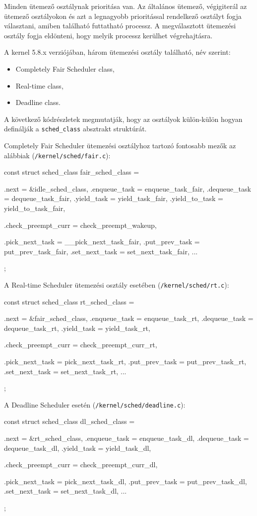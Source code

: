Minden ütemező osztálynak prioritása van. 
Az általános ütemező, végigiterál az ütemező osztályokon és azt a legnagyobb prioritással rendelkező osztályt fogja választani, amiben található futtatható processz. A megválasztott ütemezési osztály fogja eldönteni, hogy melyik processz kerülhet végrehajtásra.

A kernel 5.8.x verziójában, három ütemezési osztály található, név szerint: 
\begin{itemize}
	 \item Completely Fair Scheduler class,
	 \item Real-time class,
	 \item Deadline class.
\end{itemize}
A következő kódrészletek megmutatják, hogy az osztályok külön-külön hogyan definálják a \texttt{sched\_class} absztrakt struktúrát.

Completely Fair Scheduler ütemezési osztályhoz tartozó fontosabb mezők az alábbiak (\texttt{/kernel/sched/fair.c}):
\begin{cpp}
const struct sched_class fair_sched_class = {
	.next			= &idle_sched_class,
	.enqueue_task		= enqueue_task_fair,
	.dequeue_task		= dequeue_task_fair,
	.yield_task		= yield_task_fair,
	.yield_to_task		= yield_to_task_fair,

	.check_preempt_curr	= check_preempt_wakeup,

	.pick_next_task		= __pick_next_task_fair,
	.put_prev_task		= put_prev_task_fair,
	.set_next_task          = set_next_task_fair,
...
};
\end{cpp}

A Real-time Scheduler ütemezési osztály esetében (\texttt{/kernel/sched/rt.c}):
\begin{cpp}
const struct sched_class rt_sched_class = {
	.next			= &fair_sched_class,
	.enqueue_task		= enqueue_task_rt,
	.dequeue_task		= dequeue_task_rt,
	.yield_task		= yield_task_rt,

	.check_preempt_curr	= check_preempt_curr_rt,

	.pick_next_task		= pick_next_task_rt,
	.put_prev_task		= put_prev_task_rt,
	.set_next_task          = set_next_task_rt,
...
};
\end{cpp}

A Deadline Scheduler esetén (\texttt{/kernel/sched/deadline.c}):
\begin{cpp}
const struct sched_class dl_sched_class = {
	.next			= &rt_sched_class,
	.enqueue_task		= enqueue_task_dl,
	.dequeue_task		= dequeue_task_dl,
	.yield_task		= yield_task_dl,

	.check_preempt_curr	= check_preempt_curr_dl,

	.pick_next_task		= pick_next_task_dl,
	.put_prev_task		= put_prev_task_dl,
	.set_next_task		= set_next_task_dl,
...
};
\end{cpp}

